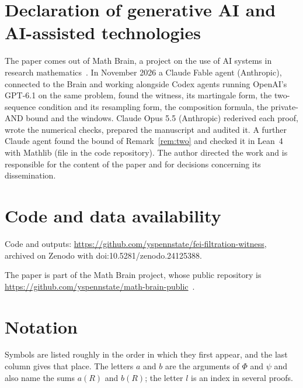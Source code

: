 \documentclass[11pt]{amsart}
\theoremstyle{remark}
\begin{document}
\section*{Declaration of generative AI and AI-assisted technologies}
The paper comes out of Math Brain, a project on the use of AI systems in research mathematics~\cite{BrainFramework,MathBrainRepo}. In November 2026 a
Claude Fable agent (Anthropic), connected to the Brain and working alongside Codex agents running OpenAI's GPT-6.1 on
the same problem, found the witness, its martingale form, the two-sequence condition and its resampling form, the
composition formula, the private-AND bound and the windows. Claude Opus 5.5 (Anthropic)
rederived each proof, wrote the numerical checks, prepared the manuscript and audited it. A further Claude agent
found the bound of Remark~\ref{rem:two} and checked it in Lean~4 with Mathlib (file in the code repository). The author directed the work and is responsible for the content of the paper and for decisions concerning its dissemination.

\section*{Code and data availability}
Code and outputs: \url{https://github.com/yspennstate/fei-filtration-witness}, archived on Zenodo with doi:10.5281/zenodo.24125388.

The paper is part of the Math Brain project, whose public repository is
\url{https://github.com/yspennstate/math-brain-public}~\cite{MathBrainRepo}.

\appendix
\section{Notation}\label{app:notation}

Symbols are listed roughly in the order in which they first appear, and the last column gives that place. The letters $a$ and $b$ are the arguments of $\Phi$ and $\psi$ and also name the sums $a(R)$ and $b(R)$; the letter $l$ is an index in several proofs.
\end{document}
